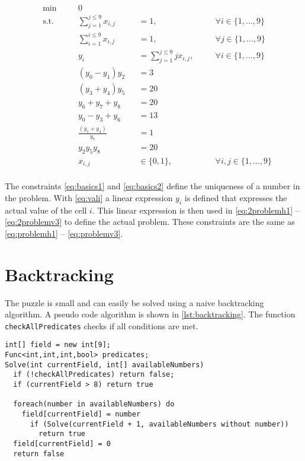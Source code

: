 \documentclass[parskip=half]{scrartcl}
\newcommand{\onetonine}{\{1,\ldots,9\}}
\begin{document}
\begin{align}
&\min \quad &&0 \\
& \text{s.t.} \quad 
&& \sum_{j=1}^{j\leq 9}x_{i,j}   &&= 1 		,&&\quad \forall i \in \onetonine \label{eq:basics1} \\
& && \sum_{i=1}^{i\leq 9}x_{i,j} 			&&=1  		,&&\quad \forall j \in \onetonine \label{eq:basics2} \\
& && y_i &&= \sum_{j=1}^{j\leq 9} jx_{i,j}  ,&&\quad \forall i \in \onetonine \label{eq:vali} \\
& && (y_0 - y_1) y_2  &&= 3 \label{eq:2problemh1} \\
& && (y_3 + y_4) y_5  &&= 20 \label{eq:2problemh2} \\
& && y_6  + y_7 + y_8 &&= 20 \label{eq:2problemh3} \\
& && y_0 - y_3 + y_6  &&= 13 \label{eq:2problemv1} \\
& && \frac{(y_1 + y_4)}{y_7} &&= 1 \label{eq:2problemv2} \\
& && y_2  y_5  y_8 &&= 20 \label{eq:2problemv3} \\
& && x_{i,j} 		&&\in \{0,1\} ,&& \quad \forall i,j \in \onetonine \\
\end{align}

The constraints \autoref{eq:basics1} and \autoref{eq:basics2} define the uniqueness of a number in the problem. With \autoref{eq:vali} a linear expression $y_i$ is defined that expresses the actual value of the cell $i$. This linear expression is then used in \autoref{eq:2problemh1} -- \autoref{eq:2problemv3} to define the actual problem. These constraints are the same as \autoref{eq:problemh1} -- \autoref{eq:problemv3}.

\clearpage
\section{Backtracking}
The puzzle is small and can easily be solved using a naive backtracking algorithm.
A pseudo code algorithm is shown in \autoref{lst:backtracking}. The function \lstinline|checkAllPredicates| checks if all conditions are met.
\begin{lstlisting}[label=lst:backtracking]
int[] field = new int[9];
Func<int,int,int,bool> predicates;
Solve(int currentField, int[] availableNumbers) 
  if (!checkAllPredicates) return false;
  if (currentField > 8) return true
	
  foreach(number in availableNumbers) do
    field[currentField] = number
      if (Solve(currentField + 1, availableNumbers without number)) 
        return true	
  field[currentField] = 0
  return false
\end{lstlisting}
\end{document}
